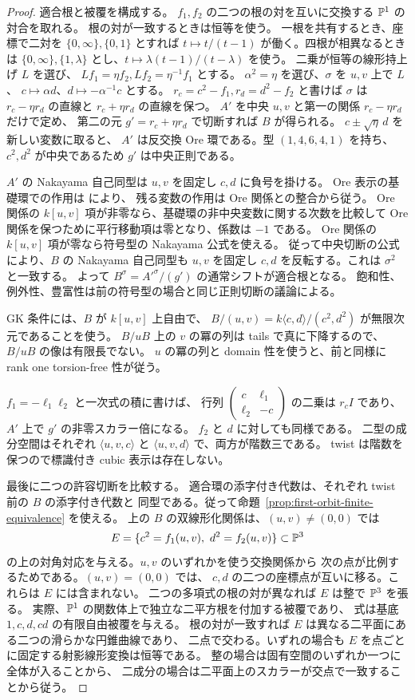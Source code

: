 \begin{proof}
適合根と被覆を構成する。
$f_1,f_2$ の二つの根の対を互いに交換する $\mathbb P^1$ の対合を取れる。
根の対が一致するときは恒等を使う。
一根を共有するとき、座標で二対を $\{0,\infty\},\{0,1\}$ とすれば
$t\mapsto t/(t-1)$ が働く。四根が相異なるときは
$\{0,\infty\},\{1,\lambda\}$ とし、$t\mapsto\lambda(t-1)/(t-\lambda)$ を使う。
二乗が恒等の線形持上げ $L$ を選び、
$Lf_1=\eta f_2,Lf_2=\eta^{-1}f_1$ とする。
$\alpha^2=\eta$ を選び、$\sigma$ を $u,v$ 上で $L$、
$c\mapsto\alpha d$、$d\mapsto-\alpha^{-1}c$ とする。
$r_c=c^2-f_1,r_d=d^2-f_2$ と書けば $\sigma$ は
$r_c-\eta r_d$ の直線と $r_c+\eta r_d$ の直線を保つ。
$A'$ を中央 $u,v$ と第一の関係 $r_c-\eta r_d$ だけで定め、
第二の元 $g'=r_c+\eta r_d$ で切断すれば $B$ が得られる。
$c\pm\sqrt\eta\,d$ を新しい変数に取ると、
$A'$ は反交換 Ore 環である。型 $(1,4,6,4,1)$ を持ち、
$c^2,d^2$ が中央であるため $g'$ は中央正則である。

$A'$ の Nakayama 自己同型は $u,v$ を固定し $c,d$ に負号を掛ける。
Ore 表示の基礎環での作用は \cite[Theorem 3.3]{LWW2014} により、
残る変数の作用は Ore 関係との整合から従う。
Ore 関係の $k[u,v]$ 項が非零なら、基礎環の非中央変数に関する次数を比較して
Ore 関係を保つために平行移動項は零となり、係数は $-1$ である。
Ore 関係の $k[u,v]$ 項が零なら符号型の Nakayama 公式を使える。
従って中央切断の公式 \cite[Lemma 1.5]{RRZ2014} により、$B$ の Nakayama 自己同型も
$u,v$ を固定し $c,d$ を反転する。これは $\sigma^2$ と一致する。
よって $B^\sigma=A'^\sigma/(g')$ の通常シフトが適合根となる。
飽和性、例外性、豊富性は前の符号型の場合と同じ正則切断の議論による。

GK 条件には、$B$ が $k[u,v]$ 上自由で、
$B/(u,v)=k\langle c,d\rangle/(c^2,d^2)$ が無限次元であることを使う。
$B/uB$ 上の $v$ の冪の列は tails で真に下降するので、
$B/uB$ の像は有限長でない。
$u$ の冪の列と domain 性を使うと、前と同様に rank one torsion-free 性が従う。

$f_1=-\ell_1\ell_2$ と一次式の積に書けば、
行列 $\left(\begin{smallmatrix}c&\ell_1\\ \ell_2&-c\end{smallmatrix}\right)$ の二乗は
$r_c I$ であり、$A'$ 上で $g'$ の非零スカラー倍になる。
$f_2$ と $d$ に対しても同様である。
二型の成分空間はそれぞれ $\langle u,v,c\rangle$ と
$\langle u,v,d\rangle$ で、両方が階数三である。
twist は階数を保つので標識付き cubic 表示は存在しない。

最後に二つの許容切断を比較する。
適合環の添字付き代数は、それぞれ twist 前の $B$ の添字付き代数と
同型である。従って命題~\ref{prop:first-orbit-finite-equivalence} を使える。
上の $B$ の双線形化関係は、$(u,v)\ne(0,0)$ では
\[
 E=\{c^2=f_1(u,v),\ d^2=f_2(u,v)\}\subset\PP^3
\]
の上の対角対応を与える。$u,v$ のいずれかを使う交換関係から
次の点が比例するためである。$(u,v)=(0,0)$ では、
$c,d$ の二つの座標点が互いに移る。これらは $E$ には含まれない。
二つの多項式の根の対が異なれば $E$ は整で $\mathbb P^3$ を張る。
実際、$\mathbb P^1$ の関数体上で独立な二平方根を付加する被覆であり、
式は基底 $1,c,d,cd$ の有限自由被覆を与える。
根の対が一致すれば $E$ は異なる二平面にある二つの滑らかな円錐曲線であり、
二点で交わる。いずれの場合も $E$ を点ごとに固定する射影線形変換は恒等である。
整の場合は固有空間のいずれか一つに全体が入ることから、
二成分の場合は二平面上のスカラーが交点で一致することから従う。


\end{proof}
